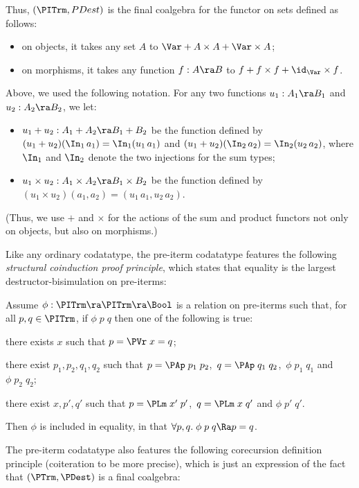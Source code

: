Thus, $(\PITrm,PDest)$ is the final coalgebra for the functor on sets defined as follows:
\begin{itemize}
	\item on objects, it takes any set $A$ to $\Var + A \times A + \Var \times A$;
	\item on morphisms, it takes any function $f:A\ra B$ to 
	$f + f \times f + \id_\Var \times f$.
\end{itemize}
%
Above, we used the following notation. For any two functions $u_1: A_1 \ra B_1$ and $u_2: A_2 \ra B_2$, we let:
\begin{itemize}
	\item $u_1 + u_2 : A_1 + A_2 \ra B_1 + B_2$ be the function defined by  $(u_1+u_2)(\In_1\,a_1) = \In_1 (u_1\,a_1)$ and $(u_1+u_2)(\In_2\,a_2) = \In_2 (u_2\, a_2)$, where $\In_1$ and $\In_2$ denote the two injections for the sum types; 
	\item $u_1 \times u_2 : A_1 \times A_2 \ra B_1 \times B_2$ be the function defined by  $(u_1\times u_2)(a_1,a_2) = (u_1\,a_1, u_2\,a_2)$. 
\end{itemize} 
(Thus, we use $+$ and $\times$ for the actions of the sum and product functors not only on objects, but also on morphisms.)

Like any ordinary codatatype, 
the pre-iterm codatatype features the following \emph{structural coinduction proof principle}, which %
states 
that equality is the largest destructor-bisimulation on pre-iterms:

\begin{prop} \label{prop-coind-piterm} \rm
Assume $\phi : \PITrm \ra \PITrm \ra \Bool$ is a relation on pre-iterms such that, for all $p,q\in\PITrm$, if $\phi\;p\;q$ then one of the following is true: 
\begin{mmmyitem} 
\item there exists $x$ such that $p = \PVr\;x = q$; 
\item there exist $p_1,p_2,q_1,q_2$ such that 
$p = \PAp\;p_1\;p_2$, \,$q = \PAp\;q_1\;q_2$, \,$\phi\;p_1\;q_1$ and $\phi\;p_2\;q_2$; 
\item there exist $x,p',q'$ such that 
$p = \PLm\;x'\;p'$, \,$q = \PLm\;x\;q'$ and $\phi\;p'\;q'$. 
\end{mmmyitem} 
%

Then $\phi$ is included in equality, in that $\forall p,q.\;\phi\;p\;q \Ra p = q$.
\end{prop} 

\smallskip 
The pre-iterm codatatype also features the following corecursion definition principle (coiteration to be more precise), which is just an expression of the fact that $(\PTrm,\PDest)$ is a final coalgebra:

